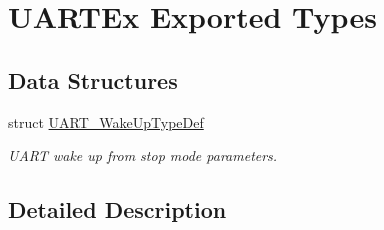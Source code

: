 \hypertarget{group___u_a_r_t_ex___exported___types}{}\section{U\+A\+R\+T\+Ex Exported Types}
\label{group___u_a_r_t_ex___exported___types}
\subsection*{Data Structures}
\begin{DoxyCompactItemize}
\item 
struct \hyperlink{struct_u_a_r_t___wake_up_type_def}{U\+A\+R\+T\+\_\+\+Wake\+Up\+Type\+Def}
\begin{DoxyCompactList}\small\item\em U\+A\+RT wake up from stop mode parameters. \end{DoxyCompactList}\end{DoxyCompactItemize}


\subsection{Detailed Description}
